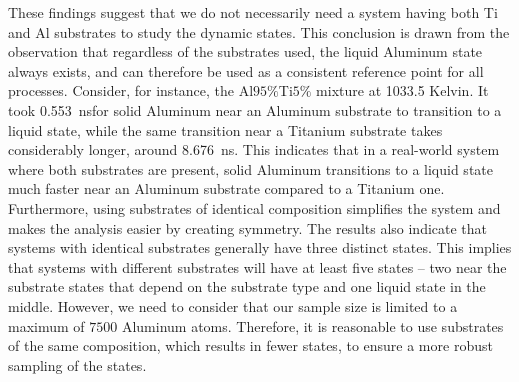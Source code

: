 These findings suggest that we do not necessarily need a system having both Ti and Al substrates to study the dynamic states. This conclusion is drawn from the observation that regardless of the substrates used, the liquid Aluminum state always exists, and can therefore be used as a consistent reference point for all processes. Consider, for instance, the Al$95\%$Ti$5\%$ mixture at 1033.5 Kelvin. It took \SI{0.553}{\nano\second}for solid Aluminum near an Aluminum substrate to transition to a liquid state, while the same transition near a Titanium substrate takes considerably longer, around \SI{8.676}{\nano\second}. This indicates that in a real-world system where both substrates are present, solid Aluminum transitions to a liquid state much faster near an Aluminum substrate compared to a Titanium one. Furthermore, using substrates of identical composition simplifies the system and makes the analysis easier by creating symmetry. The results also indicate that systems with identical substrates generally have three distinct states. This implies that systems with different substrates will have at least five states -- two near the substrate states that depend on the substrate type and one liquid state in the middle. However, we need to consider that our sample size is limited to a maximum of $7500$ Aluminum atoms. Therefore, it is reasonable to use substrates of the same composition, which results in fewer states, to ensure a more robust sampling of the states.

